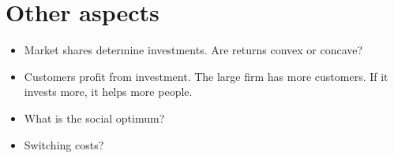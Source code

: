 \documentclass[a4paper, 11pt]{article}
\begin{document}
\section{Other aspects}
\begin{itemize}
	\item Market shares determine investments. Are returns convex or concave?
	\item Customers profit from investment. The large firm has more customers. If it invests more, it helps more people. 
	\item What is the social optimum?
	\item Switching costs?
\end{itemize}

 
\end{document}
